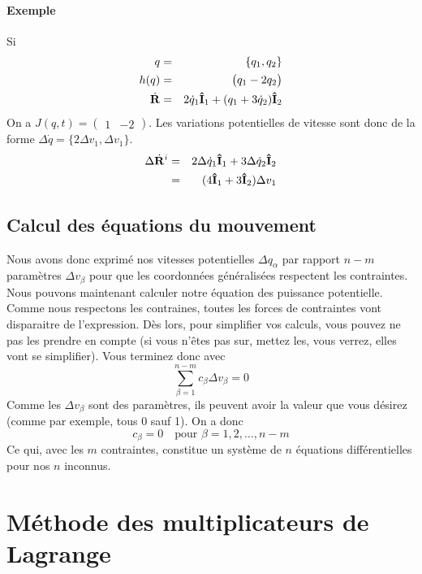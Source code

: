 \documentclass[11pt,a4paper]{article}
\newcommand\fvd[1]{\dot{\bf #1}} %
\newcommand\ui{{\bf\hat{I}}} %
\newcommand\xgd{\ensuremath{\fvd{R}}}
\newcommand\qp{\dot{q}}
\newcommand\dqp{\Delta \dot{q}}
\begin{document}
\paragraph{Exemple}
Si
\begin{eqnarray*}
	q &=& \{q_1, q_2\}\\
	h(q) &=& \begin{pmatrix}q_1 - 2q_2\end{pmatrix}\\
	\xgd &=& 2\qp_1 \ui_1 + (q_1 + 3\qp_2) \ui_2
\end{eqnarray*}
On a $J(q, t) = \begin{pmatrix}1 & -2\end{pmatrix}$.
Les variations potentielles de vitesse sont donc de la forme $\dqp = \{2\Delta v_1, \Delta v_1\}$.
\begin{eqnarray*}
	\Delta \xgd^i &=& 2 \dqp_1 \ui_1 + 3 \dqp_2 \ui_2\\
	&=& (4\ui_1 + 3\ui_2) \Delta v_1
\end{eqnarray*}


\subsection{Calcul des équations du mouvement}
Nous avons donc exprimé nos vitesses potentielles $\Delta q_\alpha$ par rapport $n - m$ paramètres $\Delta v_\beta$ pour que les coordonnées généralisées respectent les contraintes.
Nous pouvons maintenant calculer notre équation des puissance potentielle.
Comme nous respectons les contraines, toutes les forces de contraintes vont disparaitre de l'expression.
Dès lors, pour simplifier vos calculs, vous pouvez ne pas les prendre en compte (si vous n'êtes pas sur, mettez les, vous verrez, elles vont se simplifier).
Vous terminez donc avec
\[ \sum_{\beta = 1}^{n - m} c_\beta \Delta v_\beta = 0 \]
Comme les $\Delta v_\beta$ sont des paramètres, ils peuvent avoir la valeur que vous désirez
(comme par exemple, tous 0 sauf 1).
On a donc
\[ c_\beta = 0 \quad \text{pour }\beta = 1, 2, \ldots, n-m \]
Ce qui, avec les $m$ contraintes, constitue un système de $n$ équations différentielles pour nos $n$ inconnus.

\section{Méthode des multiplicateurs de Lagrange}
\end{document}

